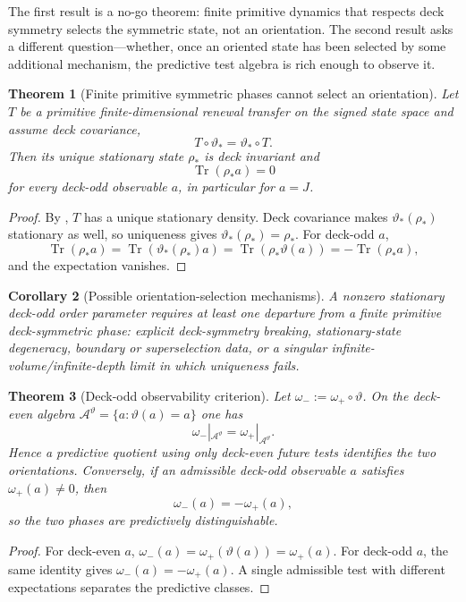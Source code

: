 \documentclass[11pt]{article}
\newtheorem{theorem}{Theorem}[section]
\newtheorem{corollary}[theorem]{Corollary}
\theoremstyle{definition}
\theoremstyle{remark}
\newcommand{\Tr}{\operatorname{Tr}}
\newcommand{\A}{\mathcal A}
\begin{document}
The first result is a no-go theorem: finite primitive dynamics that respects deck
symmetry selects the symmetric state, not an orientation.  The second result asks
a different question---whether, once an oriented state has been selected by some
additional mechanism, the predictive test algebra is rich enough to observe it.

\begin{theorem}[Finite primitive symmetric phases cannot select an orientation]
\label{thm:no-finite-orientation-selection}
Let $T$ be a primitive finite-dimensional renewal transfer on the signed state
space and assume deck covariance,
\[
 T\circ\vartheta_*=\vartheta_*\circ T.
\]
Then its unique stationary state $\rho_*$ is deck invariant and
\[
 \Tr(\rho_*a)=0
\]
for every deck-odd observable $a$, in particular for $a=J$.
\end{theorem}

\begin{proof}
By , $T$ has a unique stationary density.
Deck covariance makes $\vartheta_*(\rho_*)$ stationary as well, so uniqueness
gives $\vartheta_*(\rho_*)=\rho_*$.  For deck-odd $a$,
\[
 \Tr(\rho_*a)=\Tr(\vartheta_*(\rho_*)a)
 =\Tr(\rho_*\vartheta(a))=-\Tr(\rho_*a),
\]
and the expectation vanishes.
\end{proof}

\begin{corollary}[Possible orientation-selection mechanisms]
\label{cor:orientation-selection-mechanisms}
A nonzero stationary deck-odd order parameter requires at least one departure
from a finite primitive deck-symmetric phase: explicit deck-symmetry breaking,
stationary-state degeneracy, boundary or superselection data, or a singular
infinite-volume/infinite-depth limit in which uniqueness fails.
\end{corollary}

\begin{theorem}[Deck-odd observability criterion]
\label{thm:deck-observability}
Let $\omega_-:=\omega_+\circ\vartheta$.  On the deck-even algebra
$\A^\vartheta=\{a:\vartheta(a)=a\}$ one has
\[
 \omega_-|_{\A^\vartheta}=\omega_+|_{\A^\vartheta}.
\]
Hence a predictive quotient using only deck-even future tests identifies the
two orientations.  Conversely, if an admissible deck-odd observable $a$
satisfies $\omega_+(a)\ne0$, then
\[
 \omega_-(a)=-\omega_+(a),
\]
so the two phases are predictively distinguishable.
\end{theorem}

\begin{proof}
For deck-even $a$,
$\omega_-(a)=\omega_+(\vartheta(a))=\omega_+(a)$.  For deck-odd $a$, the same
identity gives $\omega_-(a)=-\omega_+(a)$.  A single admissible test with
different expectations separates the predictive classes.
\end{proof}
\end{document}

